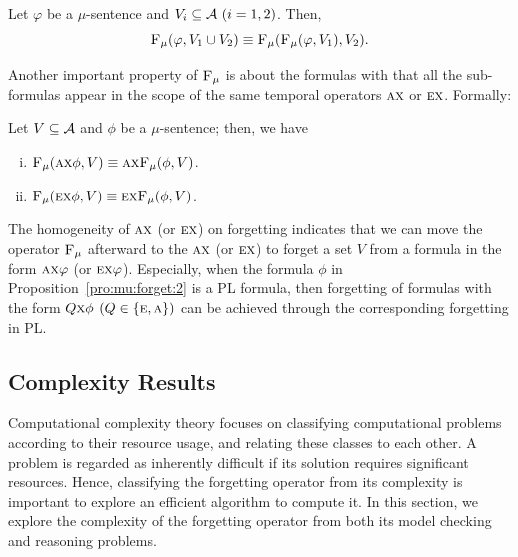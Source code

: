 \documentclass[runningheads]{llncs}
\begin{document}
\begin{corollary}[Commutativity]\label{disTFV}
Let $\varphi$ be a $\mu$-sentence and $V_i\subseteq{\cal A}~(i=1,2)$. Then,
\[
{\textsc{F}_{\textsc{$\mu$}}}(\varphi, V_1 \cup V_2) \equiv {\textsc{F}_{\textsc{$\mu$}}}({\textsc{F}_{\textsc{$\mu$}}}(\varphi, V_1), V_2).
\]
\end{corollary}

Another important property of ${\textsc{F}_{\textsc{$\mu$}}}$ is about the formulas with that all the sub-formulas appear in the scope of the same temporal operators $\textsc{a}\textsc{x}$ or $\textsc{e} \textsc{x}$. Formally:


\begin{proposition}[Homogeneity]\label{pro:mu:forget:2}
 Let $V\subseteq\cal A$ and $\phi$ be a $\mu$-sentence; then, we have %
   \begin{enumerate}[(i)]
     \item ${\textsc{F}_{\textsc{$\mu$}}}(\textsc{a}\textsc{x}\phi,V)\equiv \textsc{a}\textsc{x} {\textsc{F}_{\textsc{$\mu$}}}(\phi,V)$.
     \item ${\textsc{F}_{\textsc{$\mu$}}}(\textsc{e}\textsc{x}\phi,V)\equiv\textsc{e}\textsc{x} {\textsc{F}_{\textsc{$\mu$}}}(\phi,V)$.
   \end{enumerate}
\end{proposition}

The homogeneity of $\textsc{a}\textsc{x}$ (or $\textsc{e}\textsc{x}$) on forgetting indicates that we can move the operator ${\textsc{F}_{\textsc{$\mu$}}}$ afterward to the $\textsc{a}\textsc{x}$ (or $\textsc{e}\textsc{x}$) to forget a set $V$ from a formula in the form $\textsc{a}\textsc{x} \varphi$ (or $\textsc{e}\textsc{x} \varphi$).
Especially, when the formula $\phi$ in Proposition~\ref{pro:mu:forget:2} is a PL formula, then forgetting of formulas with the form
$Q\textsc{x} \phi$ $(Q\in \{\textsc{e}, \textsc{a}\})$ can be achieved through the corresponding forgetting in PL.

\subsection{Complexity Results}
Computational complexity theory focuses on classifying computational problems according to their resource usage, and relating these classes to each other.
A problem is regarded as inherently difficult if its solution requires significant resources.
Hence, classifying the forgetting operator from its complexity is important to explore an efficient algorithm to compute it.
In this section, we explore the complexity of the forgetting operator from both its model checking and reasoning problems.
\end{document}
